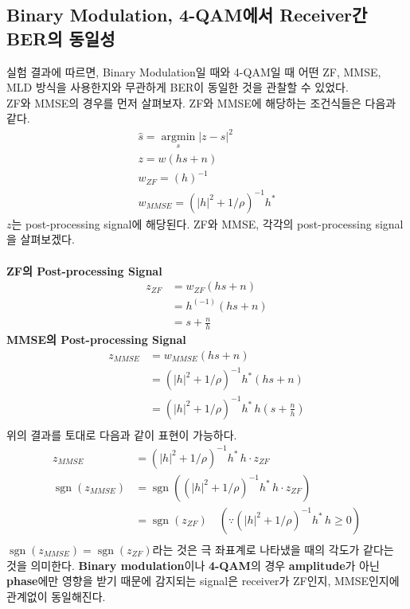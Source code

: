 \documentclass{article}
\newcommand{\bd}{\textbf} %
\providecommand{\abs}[1]{\lvert#1\rvert}
\newcommand{\sgn}{\operatorname{sgn}}
\begin{document}
\subsection{Binary Modulation, 4-QAM에서 Receiver간 BER의 동일성}
실험 결과에 따르면, Binary Modulation일 때와 4-QAM일 때 어떤 ZF, MMSE, MLD 방식을 사용한지와 무관하게 BER이 동일한 것을 관찰할 수 있었다.\\
ZF와 MMSE의 경우를 먼저 살펴보자. ZF와 MMSE에 해당하는 조건식들은 다음과 같다.
\begin{gather}
\hat{s}=\operatorname*{argmin}_s \abs{z-s}^2\\
z=w(hs+n)\\
w_{ZF}=(h)^{-1}\\
w_{MMSE}=(\abs{h}^2+1/\rho)^{-1}h^*
\end{gather}
$z$는 post-processing signal에 해당된다. ZF와 MMSE, 각각의 post-processing signal을 살펴보겠다.\\
\\
\bd{ZF의 Post-processing Signal}
\begin{equation}
\begin{split}
z_{ZF}&=w_{ZF}(hs+n)\\
&=h^(-1)(hs+n)\\
&=s+\frac{n}{h}
\end{split}
\end{equation}
\bd{MMSE의 Post-processing Signal}
\begin{equation}
\begin{split}
z_{MMSE}&=w_{MMSE}(hs+n)\\
&=(\abs{h}^2+1/\rho)^{-1}h^*(hs+n)\\
&=(\abs{h}^2+1/\rho)^{-1}h^*\, h(s+\frac{n}{h})\\
\end{split}
\end{equation}
위의 결과를 토대로 다음과 같이 표현이 가능하다.
\begin{equation}
\begin{split}
z_{MMSE}&=(\abs{h}^2+1/\rho)^{-1}h^*\,h\cdot z_{ZF}\\
\sgn(z_{MMSE}) &= \sgn((\abs{h}^2+1/\rho)^{-1}h^*\,h\cdot z_{ZF})\\
&=\sgn(z_{ZF})\quad (\because (\abs{h}^2+1/\rho)^{-1}h^*\,h \geq 0) \\
\end{split}
\end{equation}
$\sgn(z_{MMSE})=\sgn(z_{ZF})$라는 것은 극 좌표계로 나타냈을 때의 각도가 같다는 것을 의미한다.  \bd{Binary modulation}이나 \bd{4-QAM}의 경우 \bd{amplitude}가 아닌 \bd{phase}에만 영향을 받기 때문에 감지되는 signal은 receiver가 ZF인지, MMSE인지에 관계없이 동일해진다.\\
\end{document}
